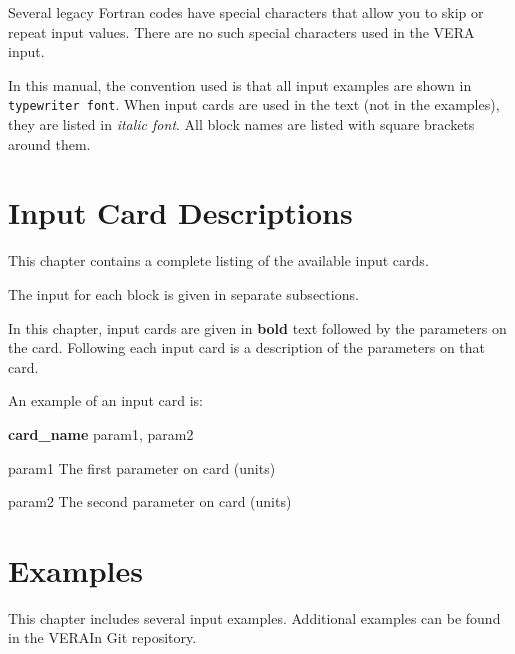 \documentclass{report}
\numberwithin{equation}{section}
\newenvironment{cardlist}
 {\begin{list}{}
  {\setlength{\labelwidth}{2.0cm}
   \setlength{\leftmargin}{2.5cm}   %
   \setlength{\labelsep}{0.25cm}    %
   \setlength{\rightmargin}{2.0cm}
   \setlength{\topsep}{-0.2cm}
   \setlength{\itemsep}{0ex plus0.2ex} }}
{\end{list}}
\begin{document}
Several legacy Fortran codes have special characters that allow you to skip
or repeat input values.   There are no such special characters used in the VERA input.

In this manual, the convention used is that all input examples are shown in {\tt typewriter font}.
When input cards are used in the text (not in the examples), they are listed in {\it italic font}.   
All block names are listed with square brackets around them.












\chapter{Input Card Descriptions} \label{chap:cards}
This chapter contains a complete listing of the available input cards.

The input for each block is given in separate subsections.

In this chapter, input cards are given in {\bf bold} text followed by the parameters on the card.
Following each input card is a description of the parameters on that card.

An example of an input card is:

{\bf card\_name} param1, param2
\begin{cardlist}
  \item[param1]  The first parameter on card (units)
  \item[param2]  The second parameter on card (units)
\end{cardlist}




\chapter{Examples}
\label{chap:example}

This chapter includes several input examples.  Additional examples can be found in the VERAIn Git repository.
\end{document}
